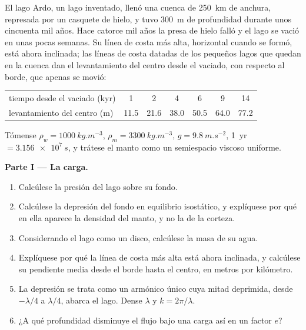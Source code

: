 \begin{problem}
\label{pb:b3:mantle-convection:1}
El lago Ardo, un lago inventado, llenó una cuenca de \qty{250}{km} de anchura, represada por un
casquete de hielo, y tuvo \qty{300}{m} de profundidad durante unos cincuenta mil años. Hace catorce
mil años la presa de hielo falló y el lago se vació en unas pocas semanas. Su
línea de costa más alta, horizontal cuando se formó, está ahora inclinada; las líneas de costa datadas de
los pequeños lagos que quedan en la cuenca dan el levantamiento del centro desde el
vaciado, con respecto al borde, que apenas se movió:

\smallskip
\begin{center}\small
\begin{tabular}{lcccccc}
\hline
tiempo desde el vaciado (kyr) & 1 & 2 & 4 & 6 & 9 & 14\\
levantamiento del centro (m) & 11.5 & 21.6 & 38.0 & 50.5 & 64.0 & 77.2\\
\hline
\end{tabular}
\end{center}
\smallskip

Tómense $\rho_w = \qty{1000}{kg.m^{-3}}$, $\rho_m = \qty{3300}{kg.m^{-3}}$, $g =
\qty{9.8}{m.s^{-2}}$, \qty{1}{yr} $= \qty{3.156e7}{s}$, y trátese el manto como
un semiespacio viscoso uniforme.

\medskip\noindent\textbf{Parte I --- La carga.}
\begin{enumerate}
  \item Calcúlese la presión del lago sobre su fondo.
  \item Calcúlese la depresión del fondo en equilibrio isostático, y explíquese
        por qué en ella aparece la densidad del manto, y no la de la corteza.
  \item Considerando el lago como un disco, calcúlese la masa de su agua.
  \item Explíquese por qué la línea de costa más alta está ahora inclinada, y calcúlese su pendiente media
        desde el borde hasta el centro, en metros por kilómetro.
  \item La depresión se trata como un armónico único cuya mitad deprimida, desde
        $-\lambda/4$ a $\lambda/4$, abarca el lago. Dense $\lambda$ y $k =
        2\pi/\lambda$.
  \item ¿A qué profundidad disminuye el flujo bajo una carga así en un factor
        $e$?
\end{enumerate}


\end{problem}
